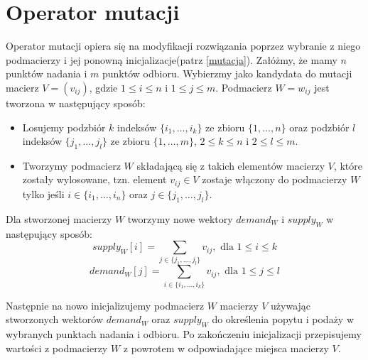 \section{Operator mutacji}
Operator mutacji opiera się na modyfikacji rozwiązania poprzez wybranie z niego podmacierzy i jej ponowną inicjalizacje(patrz \ref{mutacja}). 
Załóżmy, że mamy $n$ punktów nadania i $m$ punktów odbioru. Wybierzmy jako kandydata do mutacji macierz $V = (v_{ij})$, gdzie $1 \le i \le n$ i 
$1 \le j \le m$. Podmacierz $W = w_{ij}$ jest tworzona w następujący sposób:

\begin{itemize}
    \item Losujemy podzbiór $k$ indeksów $\{i_1, \dots, i_k\}$ ze zbioru $\{1, \dots, n\}$ oraz podzbiór $l$ indeksów $\{j_1, \dots, j_l\}$ 
    ze zbioru $\{1, \dots, m\}$, $2 \le k \le n$ i $2 \le l \le m$.
    \item Tworzymy podmacierz $W$ składającą się z takich elementów macierzy $V$, które zostały wylosowane, tzn. element $v_{ij} \in V$ 
    zostaje włączony do podmacierzy $W$ tylko jeśli $i \in \{i_1, \dots, i_n\}$ oraz $j \in \{j_1, \dots, j_l\}$.
\end{itemize}

Dla stworzonej macierzy $W$ tworzymy nowe wektory $demand_W$ i $supply_W$ w następujący sposób:
$$supply_W[i] = \sum_{j \in \{j_1, \dots, j_l\}} v_{ij}, \text{ dla } 1 \le i \le k$$
$$demand_W[j] = \sum_{i \in \{i_1, \dots, i_k\}} v_{ij}, \text{ dla } 1 \le j \le l$$

Następnie na nowo inicjalizujemy podmacierz $W$ macierzy $V$ używając stworzonych wektorów $demand_W$ oraz $supply_W$ do określenia popytu i podaży 
w wybranych punktach nadania i odbioru. Po zakończeniu inicjalizacji przepisujemy wartości z podmacierzy $W$ z powrotem w odpowiadające miejsca 
macierzy $V$.


